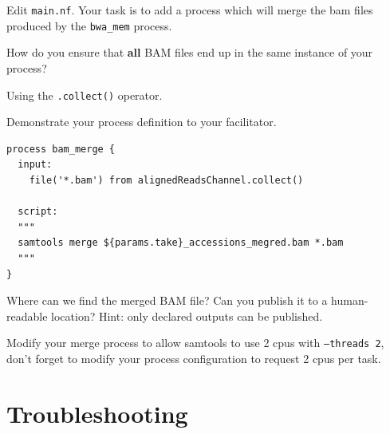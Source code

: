 \begin{steps}

Edit \texttt{main.nf}. Your task is to add a process which will merge the bam files produced by the \texttt{bwa\_mem} process. 

\begin{questions}
How do you ensure that \textbf{all} BAM files end up in the same instance of your process?
\begin{answer}
Using the \texttt{.collect()} operator.
\end{answer}
Demonstrate your process definition to your facilitator.

\begin{answer}
\begin{lstlisting}
process bam_merge {
  input:
    file('*.bam') from alignedReadsChannel.collect()

  script:
  """
  samtools merge ${params.take}_accessions_megred.bam *.bam
  """
}
\end{lstlisting}
\end{answer}
Where can we find the merged BAM file? Can you publish it to a human-readable location? Hint: only declared outputs can be published.
\end{questions}

\begin{bonus}
\begin{questions}
Modify your merge process to allow samtools to use 2 cpus with \texttt{--threads 2},
don't forget to modify your process configuration to request 2 cpus per task.
\end{questions}
\end{bonus}


\end{steps}



%



\section{Troubleshooting}

